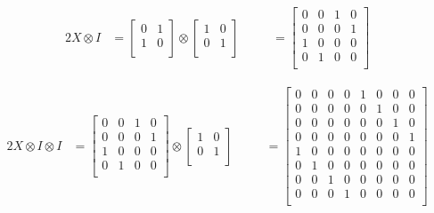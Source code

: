 \documentclass[inscr,ack,preface]{diphdthesis}
\begin{document}
\begin{alignat*}{2}
X \otimes I &= \begin{bmatrix}
    0 & 1 \\
    1 & 0 \\
\end{bmatrix} \otimes \begin{bmatrix}
    1 & 0 \\
    0 & 1 \\
\end{bmatrix} &\quad&
= \begin{bmatrix}
    0 & 0 & 1 & 0 \\
    0 & 0 & 0 & 1 \\
    1 & 0 & 0 & 0 \\
    0 & 1 & 0 & 0 \\
\end{bmatrix}
\end{alignat*}

\begin{alignat*}{2}
X \otimes I \otimes I &= \begin{bmatrix}
    0 & 0 & 1 & 0 \\
    0 & 0 & 0 & 1 \\
    1 & 0 & 0 & 0 \\
    0 & 1 & 0 & 0 \\
\end{bmatrix} \otimes \begin{bmatrix}
    1 & 0 \\
    0 & 1 \\
\end{bmatrix} &\quad&
= \begin{bmatrix}
    0 & 0 & 0 & 0 & 1 & 0 & 0 & 0 \\
    0 & 0 & 0 & 0 & 0 & 1 & 0 & 0 \\
    0 & 0 & 0 & 0 & 0 & 0 & 1 & 0 \\
    0 & 0 & 0 & 0 & 0 & 0 & 0 & 1 \\
    1 & 0 & 0 & 0 & 0 & 0 & 0 & 0 \\
    0 & 1 & 0 & 0 & 0 & 0 & 0 & 0 \\
    0 & 0 & 1 & 0 & 0 & 0 & 0 & 0 \\
    0 & 0 & 0 & 1 & 0 & 0 & 0 & 0 \\
\end{bmatrix}
\end{alignat*}
\end{document}
